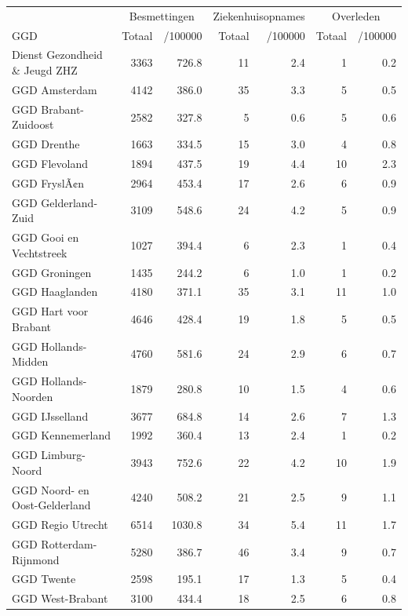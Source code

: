 \documentclass[
  english,
  man,floatsintext]{apa6}
\begin{document}
\begin{table}
\centering\begingroup\fontsize{10}{12}\selectfont

\begin{threeparttable}
\begin{tabular}{lrrrrrr}
\toprule
\multicolumn{1}{c}{ } & \multicolumn{2}{c}{Besmettingen} & \multicolumn{2}{c}{Ziekenhuisopnames} & \multicolumn{2}{c}{Overleden} \\
\cmidrule(l{3pt}r{3pt}){2-3} \cmidrule(l{3pt}r{3pt}){4-5} \cmidrule(l{3pt}r{3pt}){6-7}
GGD & Totaal & /100000 & Totaal & /100000 & Totaal & /100000\\
\midrule
Dienst Gezondheid \& Jeugd ZHZ & 3363 & 726.8 & 11 & 2.4 & 1 & 0.2\\
GGD Amsterdam & 4142 & 386.0 & 35 & 3.3 & 5 & 0.5\\
GGD Brabant-Zuidoost & 2582 & 327.8 & 5 & 0.6 & 5 & 0.6\\
GGD Drenthe & 1663 & 334.5 & 15 & 3.0 & 4 & 0.8\\
GGD Flevoland & 1894 & 437.5 & 19 & 4.4 & 10 & 2.3\\
GGD FryslÃ¢n & 2964 & 453.4 & 17 & 2.6 & 6 & 0.9\\
GGD Gelderland-Zuid & 3109 & 548.6 & 24 & 4.2 & 5 & 0.9\\
GGD Gooi en Vechtstreek & 1027 & 394.4 & 6 & 2.3 & 1 & 0.4\\
GGD Groningen & 1435 & 244.2 & 6 & 1.0 & 1 & 0.2\\
GGD Haaglanden & 4180 & 371.1 & 35 & 3.1 & 11 & 1.0\\
GGD Hart voor Brabant & 4646 & 428.4 & 19 & 1.8 & 5 & 0.5\\
GGD Hollands-Midden & 4760 & 581.6 & 24 & 2.9 & 6 & 0.7\\
GGD Hollands-Noorden & 1879 & 280.8 & 10 & 1.5 & 4 & 0.6\\
GGD IJsselland & 3677 & 684.8 & 14 & 2.6 & 7 & 1.3\\
GGD Kennemerland & 1992 & 360.4 & 13 & 2.4 & 1 & 0.2\\
GGD Limburg-Noord & 3943 & 752.6 & 22 & 4.2 & 10 & 1.9\\
GGD Noord- en Oost-Gelderland & 4240 & 508.2 & 21 & 2.5 & 9 & 1.1\\
GGD Regio Utrecht & 6514 & 1030.8 & 34 & 5.4 & 11 & 1.7\\
GGD Rotterdam-Rijnmond & 5280 & 386.7 & 46 & 3.4 & 9 & 0.7\\
GGD Twente & 2598 & 195.1 & 17 & 1.3 & 5 & 0.4\\
GGD West-Brabant & 3100 & 434.4 & 18 & 2.5 & 6 & 0.8\\

\end{tabular}
\end{threeparttable}
\end{table}
\end{document}
